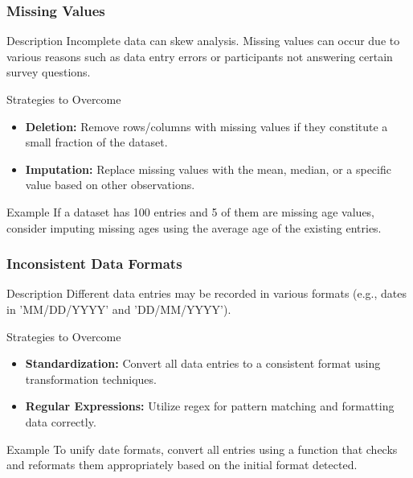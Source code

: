 \documentclass[aspectratio=169]{beamer}
\begin{document}
\begin{frame}[fragile]
    \frametitle{Missing Values}
    \begin{block}{Description}
        Incomplete data can skew analysis. Missing values can occur due to various reasons such as data entry errors or participants not answering certain survey questions.
    \end{block}
    \begin{block}{Strategies to Overcome}
        \begin{itemize}
            \item \textbf{Deletion:} Remove rows/columns with missing values if they constitute a small fraction of the dataset.
            \item \textbf{Imputation:} Replace missing values with the mean, median, or a specific value based on other observations.
        \end{itemize}
    \end{block}
    \begin{block}{Example}
        If a dataset has 100 entries and 5 of them are missing age values, consider imputing missing ages using the average age of the existing entries.
    \end{block}
\end{frame}

\begin{frame}[fragile]
    \frametitle{Inconsistent Data Formats}
    \begin{block}{Description}
        Different data entries may be recorded in various formats (e.g., dates in 'MM/DD/YYYY' and 'DD/MM/YYYY').
    \end{block}
    \begin{block}{Strategies to Overcome}
        \begin{itemize}
            \item \textbf{Standardization:} Convert all data entries to a consistent format using transformation techniques.
            \item \textbf{Regular Expressions:} Utilize regex for pattern matching and formatting data correctly.
        \end{itemize}
    \end{block}
    \begin{block}{Example}
        To unify date formats, convert all entries using a function that checks and reformats them appropriately based on the initial format detected.
    \end{block}
\end{frame}
\end{document}
